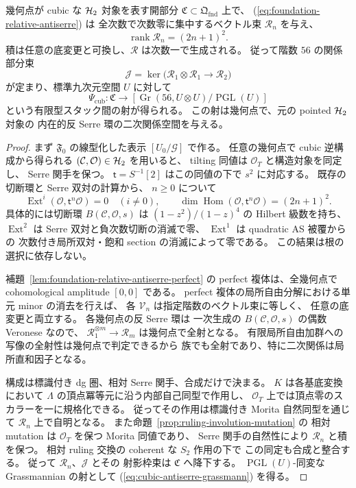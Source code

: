 \begin{proposition}
\label{prop:cubic-relative-antiserre-grassmann}
幾何点が cubic な $\mathcal H_2$ 対象を表す開部分
$\mathfrak C\subset\mathfrak Q_{\mathrm{fnd}}$ 上で、
(\ref{eq:foundation-relative-antiserre}) は
全次数で次数零に集中するベクトル束 $\mathscr R_n$ を与え、
\[
 \operatorname{rank}\mathscr R_n=(2n+1)^2 .
\]
積は任意の底変更と可換し、$\mathscr R$ は次数一で生成される。
従って階数 $56$ の関係部分束
\[
 \mathscr J=\ker\bigl(
 \mathscr R_1\otimes\mathscr R_1\longrightarrow\mathscr R_2
 \bigr)
\]
が定まり、標準九次元空間 $U$ に対して
\[
 \Psi_{\mathrm{cub}}:
 \mathfrak C\longrightarrow
 \left[\operatorname{Gr}(56,U\otimes U)/\operatorname{PGL}(U)\right]
 \tag{C-Gr}\label{eq:cubic-antiserre-grassmann}
\]
という有限型スタック間の射が得られる。
この射は幾何点で、元の pointed $\mathcal H_2$ 対象の
内在的反 Serre 環の二次関係空間を与える。
\end{proposition}
\begin{proof}
まず $\mathfrak F_0$ の線型化した表示
$[U_0/\mathcal G]$ で作る。
任意の幾何点で cubic 逆構成から得られる
$(\mathcal C,\mathcal O)\in\mathcal H_2$ を用いると、
tilting 同値は $\mathcal O_T$ と構造対象を同定し、
Serre 関手を保つ。
$\mathsf t=S^{-1}[2]$ はこの同値の下で $s^2$ に対応する。
既存の切断環と Serre 双対の計算から、
$n\ge0$ について
\[
 \operatorname{Ext}^{i}
  (\mathcal O,\mathsf t^n\mathcal O)=0\quad(i\ne0),
 \qquad
 \dim\operatorname{Hom}
  (\mathcal O,\mathsf t^n\mathcal O)=(2n+1)^2.
\]
具体的には切断環 $B(\mathcal C,\mathcal O,s)$ は
$(1-z^2)/(1-z)^4$ の Hilbert 級数を持ち、
$\operatorname{Ext}^2$ は Serre 双対と負次数切断の消滅で零、
$\operatorname{Ext}^1$ は quadratic AS 被覆からの
次数付き局所双対・飽和 section の消滅によって零である。
この結果は根の選択に依存しない。

補題~\ref{lem:foundation-relative-antiserre-perfect} の
perfect 複体は、全幾何点で cohomological amplitude $[0,0]$ である。
perfect 複体の局所自由分解における単元 minor の消去を行えば、
各 $\mathscr V_n$ は指定階数のベクトル束に等しく、
任意の底変更と両立する。
各幾何点の反 Serre 環は
一次生成の $B(\mathcal C,\mathcal O,s)$ の偶数 Veronese なので、
$\mathscr R_1^{\otimes m}\to\mathscr R_m$ は幾何点で全射となる。
有限局所自由加群への写像の全射性は幾何点で判定できるから
族でも全射であり、特に二次関係は局所直和因子となる。

構成は標識付き dg 圏、相対 Serre 関手、合成だけで決まる。
$K$ は各基底変換において
$\Lambda$ の頂点冪等元に沿う内部自己同型で作用し、
$\mathcal O_T$ 上では頂点零のスカラーを一に規格化できる。
従ってその作用は標識付き Morita 自然同型を通じて
$\mathscr R_n$ 上で自明となる。
また命題~\ref{prop:ruling-involution-mutation} の
相対 mutation は $\mathcal O_T$ を保つ Morita 同値であり、
Serre 関手の自然性により $\mathscr R_n$ と積を保つ。
相対 ruling 交換の coherent な $S_2$ 作用の下で
この同定も合成と整合する。
従って $\mathscr R_n$、$\mathscr J$ とその
射影枠束は $\mathfrak C$ へ降下する。
$\operatorname{PGL}(U)$-同変な Grassmannian の射として
(\ref{eq:cubic-antiserre-grassmann}) を得る。
\end{proof}

